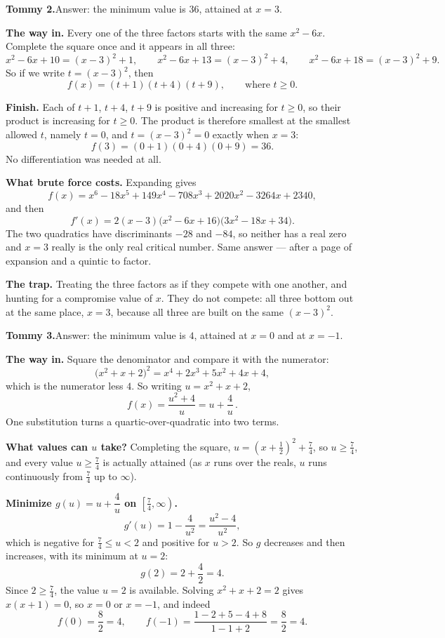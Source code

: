 \documentclass[11pt]{article}
\begin{document}
\bigskip
\noindent\textbf{Tommy 2.}\quad Answer: the minimum value is $\boxed{36}$, attained at
$x=3$.

\medskip
\noindent\textbf{The way in.} Every one of the three factors starts with the same
$x^{2}-6x$. Complete the square once and it appears in all three:
\[
  x^{2}-6x+10=(x-3)^{2}+1,\qquad
  x^{2}-6x+13=(x-3)^{2}+4,\qquad
  x^{2}-6x+18=(x-3)^{2}+9 .
\]
So if we write $t=(x-3)^{2}$, then
\[
  f(x)=(t+1)(t+4)(t+9),\qquad\text{where } t\ge0 .
\]

\medskip
\noindent\textbf{Finish.} Each of $t+1$, $t+4$, $t+9$ is positive and increasing for
$t\ge0$, so their product is increasing for $t\ge0$. The product is therefore smallest at
the smallest allowed $t$, namely $t=0$, and $t=(x-3)^{2}=0$ exactly when $x=3$:
\[
  f(3)=(0+1)(0+4)(0+9)=36 .
\]
No differentiation was needed at all.

\medskip
\noindent\textbf{What brute force costs.} Expanding gives
\[
  f(x)=x^{6}-18x^{5}+149x^{4}-708x^{3}+2020x^{2}-3264x+2340,
\]
and then
\[
  f'(x)=2(x-3)\bigl(x^{2}-6x+16\bigr)\bigl(3x^{2}-18x+34\bigr).
\]
The two quadratics have discriminants $-28$ and $-84$, so neither has a real zero and
$x=3$ really is the only real critical number. Same answer --- after a page of expansion
and a quintic to factor.

\medskip
\noindent\textbf{The trap.} Treating the three factors as if they compete with one
another, and hunting for a compromise value of $x$. They do not compete: all three bottom
out at the same place, $x=3$, because all three are built on the same $(x-3)^{2}$.

\bigskip
\noindent\textbf{Tommy 3.}\quad Answer: the minimum value is $\boxed{4}$, attained at
$x=0$ and at $x=-1$.

\medskip
\noindent\textbf{The way in.} Square the denominator and compare it with the numerator:
\[
  \bigl(x^{2}+x+2\bigr)^{2}=x^{4}+2x^{3}+5x^{2}+4x+4,
\]
which is the numerator less $4$. So writing $u=x^{2}+x+2$,
\[
  f(x)=\frac{u^{2}+4}{u}=u+\frac{4}{u}\,.
\]
One substitution turns a quartic-over-quadratic into two terms.

\medskip
\noindent\textbf{What values can $u$ take?} Completing the square,
$u=\left(x+\tfrac{1}{2}\right)^{2}+\tfrac{7}{4}$, so $u\ge\tfrac{7}{4}$, and every value
$u\ge\tfrac{7}{4}$ is actually attained (as $x$ runs over the reals, $u$ runs continuously
from $\tfrac{7}{4}$ up to $\infty$).

\medskip
\noindent\textbf{Minimize $g(u)=u+\dfrac{4}{u}$ on $\left[\tfrac{7}{4},\infty\right)$.}
\[
  g'(u)=1-\frac{4}{u^{2}}=\frac{u^{2}-4}{u^{2}},
\]
which is negative for $\tfrac{7}{4}\le u<2$ and positive for $u>2$. So $g$ decreases and
then increases, with its minimum at $u=2$:
\[
  g(2)=2+\frac{4}{2}=4 .
\]
Since $2\ge\tfrac{7}{4}$, the value $u=2$ is available. Solving
$x^{2}+x+2=2$ gives $x(x+1)=0$, so $x=0$ or $x=-1$, and indeed
\[
  f(0)=\frac{8}{2}=4,\qquad f(-1)=\frac{1-2+5-4+8}{1-1+2}=\frac{8}{2}=4 .
\]
\end{document}
